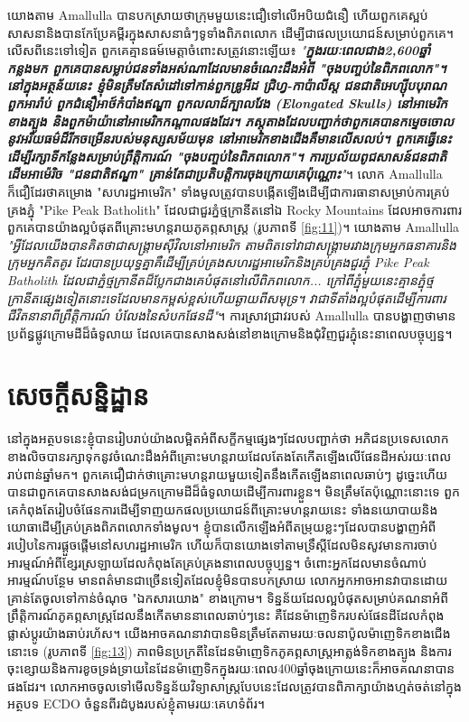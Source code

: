 \documentclass[10pt,twocolumn,letterpaper]{article}
\begin{document}
	យោងតាម Amallulla  បានបកស្រាយថាក្រុមមួយនេះជឿទៅលើអបិយជំនឿ ហើយពួកគេស្អប់សាសនានិងបានកែប្រែគម្ពីរក្នុងសាសនាធំៗទូទាំងពិភពលោក ដើម្បីជាផលប្រយោជន៍សម្រាប់ពួកគេ។ លើសពីនេះទៅទៀត ពួកគេគ្មានធម៍មេត្តាចំពោះសត្រូវនោះឡើយ៖ \textit{"\textbf{ក្នុងរយៈពេលជាង2,600ឆ្នាំកន្លងមក ពួកគេបានសម្លាប់ជនទាំងអស់ណាដែលមានចំណេះដឹងអំពី "ចុងបញ្ចប់នៃពិភពលោក"។ នៅក្នុងអត្ថន័យនេះ ខ្ញុំមិនត្រឹមតែសំដៅទៅកាន់ពួកឌ្រូអីដ ជ្រិហ្វ-កាប៉ាលីស្ត ជនជាតិអេហ្ស៊ីបបុរាណ ពួកអារ៉ាប់ ពួកជំនឿអាថ៍កំបាំងឥណ្ឌា ពួកលលាដ៍ក្បាលវែង (Elongated Skulls) នៅអាមេរិកខាងត្បូង និងពួកម៉ាយ៉ានៅអាមេរិកកណ្តាលផងដែរ។ ភស្តុតាងដែលបញ្ជាក់ថាពួកគេបានកម្ទេចចោលនូវអរិយធម៌ដ៏រីកចម្រើនរបស់មនុស្សសម័យមុន នៅអាមេរិកខាងជើងគឺមានលើសលប់។ ពួកគេធ្វើនេះដើម្បីរក្សាទីកន្លែងសម្រាប់ព្រឹត្តិការណ៍ "ចុងបញ្ចប់នៃពិភពលោក"។ ការប្រល័យពូជសាសន៍ជនជាតិដើមអាម៉េរិច "ជនជាតិឥណ្ឌា" គ្រាន់តែជាប្រតិបត្តិការចុងក្រោយគេប៉ុណ្ណោះ}"}\cite{33,34}។
លោក Amallulla ក៏ជឿដែរថាគម្រោង "សហរដ្ឋអាមេរិក" ទាំងមូលត្រូវបានបង្កើតឡើងដើម្បីជាការធានាសម្រាប់ការគ្រប់គ្រងភ្នុំ "Pike Peak Batholith" ដែលជាជួរភ្នំថ្មក្រានីតនៅឯ Rocky Mountains ដែលអាចការពារពួកគេបានយ៉ាងល្អបំផុតពីគ្រោះមហន្តរាយភូគព្ភសាស្ត្រ (រូបភាពទី \ref{fig:11})។ យោងតាម Amallulla \textit{"អ្វីដែលយើងបានគិតថាជាសង្គ្រាមស៊ីវិលនៅអាមេរិក តាមពិតទៅវាជាសង្គ្រាមរវាងក្រុមអ្នកធនាគារនិងក្រុមអ្នកគិតគូរ ដែរបានប្រយុទ្ធគ្នាគឺដើម្បីគ្រប់គ្រងសហរដ្ឋអាមេរិកនិងគ្រប់គ្រងជួរភ្នុំ Pike Peak Batholith ដែលជាភ្នំថ្មក្រានីតដ៏ប្លែកជាងគេបំផុតនៅលើពិភពលោក... ក្រៅពីភ្នុំមួយនេះ​ គ្មានភ្នុំថ្មក្រានីតផ្សេងទៀតនោះទេដែលមានកម្ពស់ខ្ពស់ហើយឆ្ងាយពីសមុទ្រ។  វាជាទីតាំងល្អបំផុតដើម្បីការពារជីវិតនានាពីព្រឹត្តិការណ៍ បំលែងនៃសំបកផែនដី"}\cite{33,34}។ ការស្រាវជ្រាវរបស់ Amallulla បានបង្ហាញថាមានប្រព័ន្ធផ្លូវក្រោមដីដ៏ធំទូលាយ ដែលគេបានសាងសង់នៅខាងក្រោមនិងជុំវិញជួរភ្នុំនេះនាពេលបច្ចុប្បន្ន\cite{36}។

\section{សេចក្តីសន្និដ្ឋាន}

	នៅក្នុងអត្ថបទនេះខ្ញុំបានរៀបរាប់យ៉ាងលម្អិតអំពីសក្ខីកម្មផ្សេងៗដែលបញ្ជាក់ថា អភិជនប្រទេសលោកខាងលិចបានរក្សាទុកនូវចំណេះដឹងអំពីគ្រោះមហន្តរាយដែលតែងតែកើតឡើងលើផែនដីអស់រយៈពេលរាប់ពាន់ឆ្នាំមក។ ពួកគេជឿជាក់ថាគ្រោះមហន្តរាយមួយទៀតនឹងកើតឡើងនាពេលឆាប់ៗ ដូច្នេះហើយបានជាពួកគេបានសាងសង់ជម្រកក្រោមដីដ៏ធំទូលាយដើម្បីការពារខ្លួន។ មិនត្រឹមតែប៉ុណ្ណោះនោះទេ ពួកគេកំពុងតែរៀបចំផែនការដើម្បីទាញយកផលប្រយោជន៍ពីគ្រោះមហន្តរាយនេះ ទាំងនយោបាយនិងយោធាដើម្បីគ្រប់គ្រងពិភពលោកទាំងមូល។ ខ្ញុំបានលើកឡើងអំពីតម្រុយខ្លះៗដែលបានបង្ហាញអំពីរបៀបនៃការផ្តួចផ្តើមនៅសហរដ្ឋអាមេរិក ហើយក៏បានយោងទៅតាមទ្រឹស្តីដែលមិនសូវមានការចាប់អារម្មណ៍អំពីខ្សែរស្រឡាយដែលកំពុងតែគ្រប់គ្រងនាពេលបច្ចុប្បន្ន។ ចំពោះអ្នកដែលមានចំណាប់អារម្មណ៍បន្ថែម មានពត៌មានជាច្រើនទៀតដែលខ្ញុំមិនបានបកស្រាយ លោកអ្នកអាចអានវាបានដោយគ្រាន់តែចូលទៅកាន់ចំណុច "ឯកសារយោង" ខាងក្រោម។
ទិន្នន័យដែលល្អបំផុតសម្រាប់គណនាអំពីព្រឹត្តិការណ៍ភូគព្ភសាស្ត្រ​ដែលនឹងកើតមាននាពេលឆាប់ៗនេះ គឺដែនម៉ាញេទិករបស់ផែនដីដែលកំពុងផ្លាស់ប្តូរយ៉ាងឆាប់រហ័ស។ យើងអាចគណនាវាបានមិនត្រឹមតែតាមរយៈចលនាប៉ូលម៉ាញេទិកខាងជើងនោះទេ (រូបភាពទី \ref{fig:13}) ភាពមិនប្រក្រតីនៃដែនម៉ាញេទិកភូគព្ភសាស្ត្រអាត្លង់ទិកខាងត្បូង និងការចុះខ្សោយនិងការខូចទ្រង់ទ្រាយនៃដែនម៉ាញេទិកក្នុងរយៈពេល400ឆ្នាំចុងក្រោយនេះក៏អាចគណនាបានផងដែរ\cite{3}។ លោកអាចចូលទៅមើលទិន្នន័យវិទ្យាសាស្ត្របែបនេះដែលត្រូវបានពិភាក្សាយ៉ាងហ្មត់ចត់នៅក្នុងអត្ថបទ ECDO ចំនួនពីរដំបូងរបស់ខ្ញុំតាមរយៈគេហទំព័រ\cite{3}។
\end{document}
